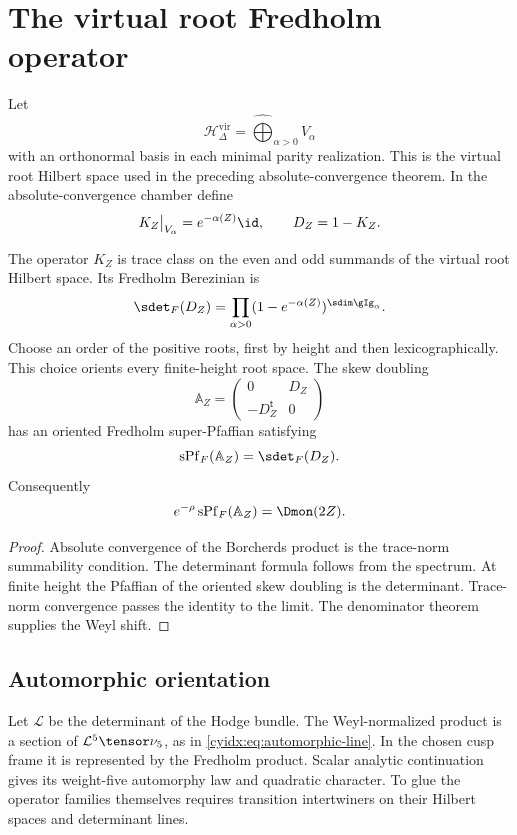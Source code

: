 \chapter{The virtual root Fredholm operator}
Let
\[
 \mathcal H^{\mathrm{vir}}_\Delta
 =\widehat\bigoplus_{\alpha>0}V_\alpha
\]
with an orthonormal basis in each minimal parity realization.
This is the virtual root Hilbert space used in the preceding
absolute-convergence theorem.  In the absolute-convergence chamber define
\[
 K_Z\big|_{V_\alpha}=e^{-\alpha(Z)}\id,
 \qquad
 D_Z=1-K_Z.
\]

\begin{theorem}
The operator $K_Z$ is trace class on the even and odd summands of the virtual root Hilbert space.  Its Fredholm Berezinian is
\[
 \sdet_F(D_Z)
 =\prod_{\alpha>0}(1-e^{-\alpha(Z)})^{\sdim\gIg_\alpha}.
\]
Choose an order of the positive roots, first by height and then lexicographically.  This choice orients every finite-height root space.  The skew doubling
\[
 \mathbb A_Z=
 \begin{pmatrix}0&D_Z\\-D_Z^{\mathsf t}&0\end{pmatrix}
\]
has an oriented Fredholm super-Pfaffian satisfying
\[
 \operatorname{sPf}_F(\mathbb A_Z)=\sdet_F(D_Z).
\]
Consequently
\[
 e^{-\rho}\operatorname{sPf}_F(\mathbb A_Z)=\Dmon(2Z).
\]
\end{theorem}
\begin{proof}
Absolute convergence of the Borcherds product is the trace-norm summability condition.  The determinant formula follows from the spectrum.  At finite height the Pfaffian of the oriented skew doubling is the determinant.  Trace-norm convergence passes the identity to the limit.  The denominator theorem supplies the Weyl shift.
\end{proof}

\section{Automorphic orientation}
Let $\mathcal L$ be the determinant of the Hodge bundle.
The Weyl-normalized product is a section of
$\mathcal L^5\tensor\nu_5$, as in
\eqref{cyidx:eq:automorphic-line}. In the chosen cusp
frame it is represented by the Fredholm product.
Scalar analytic continuation gives its weight-five
automorphy law and quadratic character. To glue the
operator families themselves requires transition
intertwiners on their Hilbert spaces and determinant lines.

